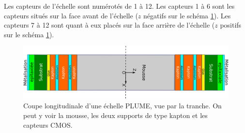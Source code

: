     Les capteurs de l'\'echelle sont num\'erot\'es de 1 \`a 12. Les capteurs 1 \`a 6 sont les capteurs situ\'es sur la face avant de l'échelle ($z$ n\'egatifs sur le sch\'ema \ref{fig:coupePLUME}). Les capteurs 7 \`a 12 sont quant \`a eux plac\'es sur la face arri\`ere de l'\'echelle ($z$ positifs sur le sch\'ema \ref{fig:coupePLUME}).


    
    \begin{figure}[!h]
     \begin{center} 
      \includegraphics[scale=0.8]{./figures/PLUME_coupe.png}
      \caption{Coupe longitudinale d'une \'echelle PLUME, vue par la tranche. On peut y voir la mousse, les deux supports de type kapton et les capteurs CMOS.}
      \label{fig:coupePLUME}
     \end{center}
    \end{figure}
    
